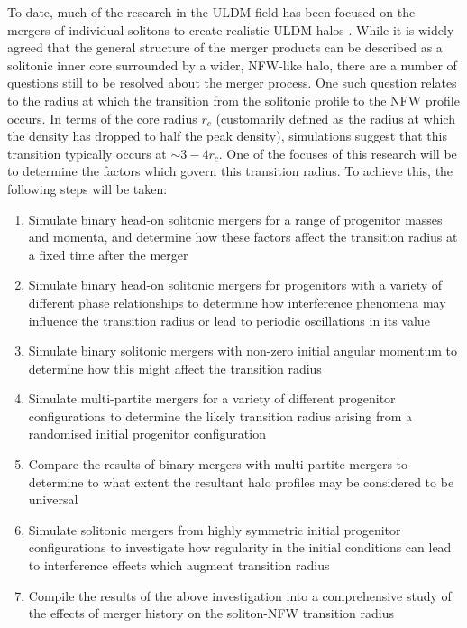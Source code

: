 To date, much of the research in the ULDM field has been focused on the mergers of individual solitons to create realistic ULDM halos \cite{Veltmaat:2016rxo, Schive:2014hza}. While it is widely agreed that the general structure of the merger products can be described as a solitonic inner core surrounded by a wider, NFW-like halo, there are a number of questions still to be resolved about the merger process. One such question relates to the radius at which the transition from the solitonic profile to the NFW profile occurs. In terms of the core radius $r_c$ (customarily defined as the radius at which the density has dropped to half the peak density), simulations suggest that this transition typically occurs at $\sim 3-4r_c$. One of the focuses of this research will be to determine the factors which govern this transition radius. To achieve this, the following steps will be taken:
\begin{enumerate}
    \item Simulate binary head-on solitonic mergers for a range of progenitor masses and momenta, and determine how these factors affect the transition radius at a fixed time after the merger
    \item Simulate binary head-on solitonic mergers for progenitors with a variety of different phase relationships to determine how interference phenomena may influence the transition radius or lead to periodic oscillations in its value
    \item Simulate binary solitonic mergers with non-zero initial angular momentum to determine how this might affect the transition radius
    \item Simulate multi-partite mergers for a variety of different progenitor configurations to determine the likely transition radius arising from a randomised initial progenitor configuration
    \item Compare the results of binary mergers with multi-partite mergers to determine to what extent the resultant halo profiles may be considered to be universal
    \item Simulate solitonic mergers from highly symmetric initial progenitor configurations to investigate how regularity in the initial conditions can lead to interference effects which augment transition radius
    \item Compile the results of the above investigation into a comprehensive study of the effects of merger history on the soliton-NFW transition radius
\end{enumerate}

